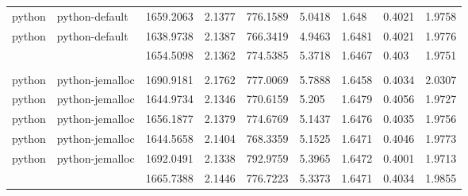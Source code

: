 \begin{longtable}[h]{|lllllllll|}
python         & python-default         & 1659.2063                 & 2.1377                                                               & 776.1589              & 5.0418           & 1.648            & 0.4021       & 1.9758        \\
python         & python-default         & 1638.9738                 & 2.1387                                                               & 766.3419              & 4.9463           & 1.6481           & 0.4021       & 1.9776        \\
               &                        & 1654.5098                 & 2.1362                                                               & 774.5385              & 5.3718           & 1.6467           & 0.403        & 1.9751        \\
               &                        &                           &                                                                      &                       &                  &                  &              &               \\
python         & python-jemalloc        & 1690.9181                 & 2.1762                                                               & 777.0069              & 5.7888           & 1.6458           & 0.4034       & 2.0307        \\
python         & python-jemalloc        & 1644.9734                 & 2.1346                                                               & 770.6159              & 5.205            & 1.6479           & 0.4056       & 1.9727        \\
python         & python-jemalloc        & 1656.1877                 & 2.1379                                                               & 774.6769              & 5.1437           & 1.6476           & 0.4035       & 1.9756        \\
python         & python-jemalloc        & 1644.5658                 & 2.1404                                                               & 768.3359              & 5.1525           & 1.6471           & 0.4046       & 1.9773        \\
python         & python-jemalloc        & 1692.0491                 & 2.1338                                                               & 792.9759              & 5.3965           & 1.6472           & 0.4001       & 1.9713        \\
               &                        & 1665.7388                 & 2.1446                                                               & 776.7223              & 5.3373           & 1.6471           & 0.4034       & 1.9855        \\

\end{longtable}
